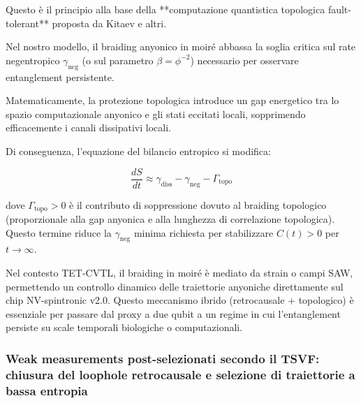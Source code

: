 \documentclass[11pt,a4paper]{article}
\theoremstyle{plain}
\theoremstyle{definition}
\begin{document}
\vspace{0.3cm}


Questo è il principio alla base della **computazione quantistica topologica fault-tolerant** proposta da Kitaev e altri.



\vspace{0.5cm}

Nel nostro modello, il braiding anyonico in moiré abbassa la soglia critica sul rate negentropico \(\gamma_{\text{neg}}\) (o sul parametro \(\beta = \phi^{-2}\)) necessario per osservare entanglement persistente. 

\vspace{0.3cm}

Matematicamente, la protezione topologica introduce un gap energetico tra lo spazio computazionale anyonico e gli stati eccitati locali, sopprimendo efficacemente i canali dissipativi locali. 


\vspace{0.3cm}

Di conseguenza, l'equazione del bilancio entropico si modifica:

\[
\frac{dS}{dt} \approx \gamma_{\text{diss}} - \gamma_{\text{neg}} - \Gamma_{\text{topo}}
\]

dove \(\Gamma_{\text{topo}} > 0\) è il contributo di soppressione dovuto al braiding topologico (proporzionale alla gap anyonica e alla lunghezza di correlazione topologica). Questo termine riduce la \(\gamma_{\text{neg}}\) minima richiesta per stabilizzare \(C(t) > 0\) per \(t \to \infty\).


\vspace{0.5cm}

Nel contesto TET-CVTL, il braiding in moiré è mediato da strain o campi SAW, permettendo un controllo dinamico delle traiettorie anyoniche direttamente sul chip NV-spintronic v2.0. Questo meccanismo ibrido (retrocausale + topologico) è essenziale per passare dal proxy a due qubit a un regime in cui l'entanglement persiste su scale temporali biologiche o computazionali.




\vspace{0.6cm}



\subsubsection{Weak measurements post-selezionati secondo il TSVF: chiusura del loophole retrocausale e selezione di traiettorie a bassa entropia}
\end{document}
